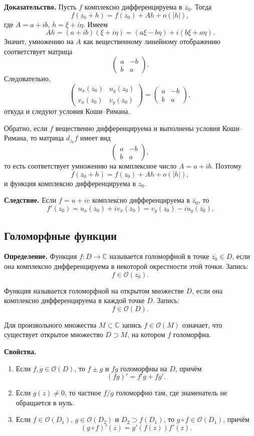 \documentclass[12pt,a4paper]{article}
\newcommand{\CC}{\mathbb C}
\newcommand{\OO}{\mathcal O}
\begin{document}
\textbf{Доказательство.}
Пусть \(f\) комплексно дифференцируема в \(z_0\). Тогда
\[
f(z_0+h)=f(z_0)+Ah+o(|h|),
\]
где \(A=a+ib\), \(h=\xi+i\eta\). Имеем
\[
Ah=(a+ib)(\xi+i\eta)
=(a\xi-b\eta)+i(b\xi+a\eta).
\]
Значит, умножению на \(A\) как вещественному линейному отображению
соответствует матрица
\[
\begin{pmatrix}
 a & -b\\
 b & a
\end{pmatrix}.
\]
Следовательно,
\[
\begin{pmatrix}
 u_x(z_0) & u_y(z_0)\\
 v_x(z_0) & v_y(z_0)
\end{pmatrix}
=
\begin{pmatrix}
 a & -b\\
 b & a
\end{pmatrix},
\]
откуда и следуют условия Коши--Римана.

Обратно, если \(f\) вещественно дифференцируема и выполнены условия
Коши--Римана, то матрица \(d_{z_0}f\) имеет вид
\[
\begin{pmatrix}
 a & -b\\
 b & a
\end{pmatrix},
\]
то есть соответствует умножению на комплексное число \(A=a+ib\). Поэтому
\[
f(z_0+h)=f(z_0)+Ah+o(|h|),
\]
и функция комплексно дифференцируема в \(z_0\).

\textbf{Следствие.} Если \(f=u+iv\) комплексно дифференцируема в \(z_0\), то
\[
f'(z_0)
=u_x(z_0)+iv_x(z_0)
=v_y(z_0)-iu_y(z_0).
\]

\subsection{Голоморфные функции}

\textbf{Определение.} Функция \(f:D\to\CC\) называется голоморфной в точке
\(z_0\in D\), если она комплексно дифференцируема в некоторой окрестности
этой точки. Запись:
\[
f\in\OO(z_0).
\]

Функция называется голоморфной на открытом множестве \(D\), если она
комплексно дифференцируема в каждой точке \(D\). Запись:
\[
f\in\OO(D).
\]

Для произвольного множества \(M\subset\CC\) запись \(f\in\OO(M)\) означает,
что существует открытое множество \(D\supset M\), на котором \(f\) голоморфна.

\textbf{Свойства.}
\begin{enumerate}[label=\arabic*)]
  \item Если \(f,g\in\OO(D)\), то \(f\pm g\) и \(fg\) голоморфны на \(D\), причём
  \[
  (fg)'=f'g+fg'.
  \]

  \item Если \(g(z)\neq0\), то частное \(f/g\) голоморфно там, где знаменатель
  не обращается в нуль.

  \item Если \(f\in\OO(D_1)\), \(g\in\OO(D_2)\) и \(D_2\supset f(D_1)\), то
  \(g\circ f\in\OO(D_1)\), причём
  \[
  (g\circ f)'(z)=g'(f(z))f'(z).
  \]
\end{enumerate}
\end{document}
